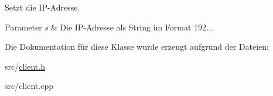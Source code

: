 Setzt die I\+P-\/\+Adresse. 


\begin{DoxyParams}{Parameter}
{\em s} & Die I\+P-\/\+Adresse als String im Format 192... \\
\hline
\end{DoxyParams}


Die Dokumentation für diese Klasse wurde erzeugt aufgrund der Dateien\+:\begin{DoxyCompactItemize}
\item 
src/\hyperlink{client_8h}{client.\+h}\item 
src/client.\+cpp\end{DoxyCompactItemize}
